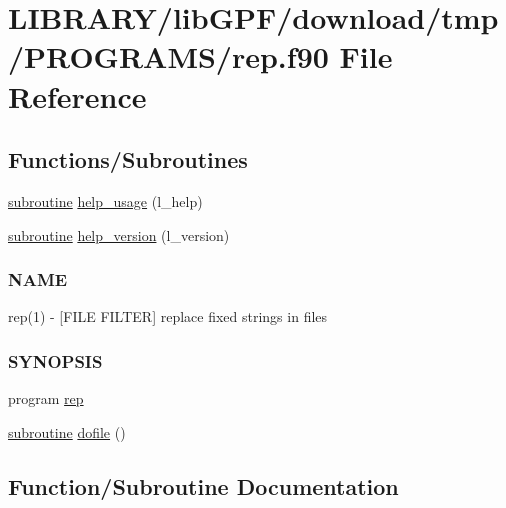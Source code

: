 \hypertarget{rep_8f90}{}\section{L\+I\+B\+R\+A\+R\+Y/lib\+G\+P\+F/download/tmp/\+P\+R\+O\+G\+R\+A\+M\+S/rep.f90 File Reference}
\label{rep_8f90}
\subsection*{Functions/\+Subroutines}
\begin{DoxyCompactItemize}
\item 
\hyperlink{M__stopwatch_83_8txt_acfbcff50169d691ff02d4a123ed70482}{subroutine} \hyperlink{rep_8f90_a3e09a3b52ee8fb04eeb93fe5761626a8}{help\+\_\+usage} (l\+\_\+help)
\item 
\hyperlink{M__stopwatch_83_8txt_acfbcff50169d691ff02d4a123ed70482}{subroutine} \hyperlink{rep_8f90_a39c21619b08a3c22f19e2306efd7f766}{help\+\_\+version} (l\+\_\+version)
\begin{DoxyCompactList}\small\item\em \subsubsection*{N\+A\+ME}

rep(1) -\/ \mbox{[}F\+I\+LE F\+I\+L\+T\+ER\mbox{]} replace fixed strings in files \subsubsection*{S\+Y\+N\+O\+P\+S\+IS}\end{DoxyCompactList}\item 
program \hyperlink{rep_8f90_a6e3f64c6bb01cd2bdc33472e0505a863}{rep}
\item 
\hyperlink{M__stopwatch_83_8txt_acfbcff50169d691ff02d4a123ed70482}{subroutine} \hyperlink{rep_8f90_a9baed1bfe8861174e553399700e95ba2}{dofile} ()
\end{DoxyCompactItemize}


\subsection{Function/\+Subroutine Documentation}
\mbox{\label{rep_8f90_a9baed1bfe8861174e553399700e95ba2}} 
